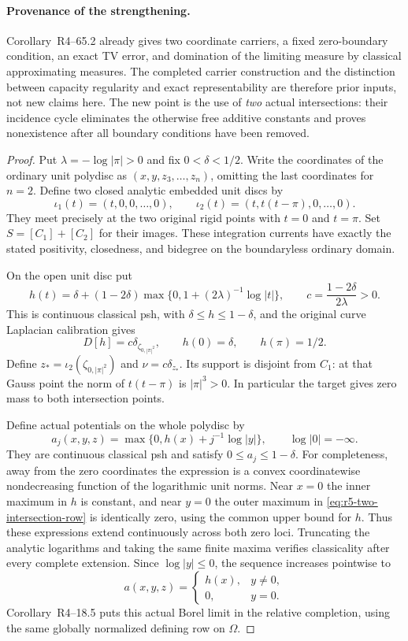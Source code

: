 \documentclass[11pt,a4paper]{article}
\numberwithin{equation}{section}
\theoremstyle{definition}
\theoremstyle{remark}
\begin{document}
\paragraph{Provenance of the strengthening.}
Corollary~\textup{R4--65.2}
already gives two coordinate carriers, a fixed zero-boundary
condition, an exact TV error, and domination of the limiting
measure by classical approximating measures.  The completed
carrier construction and the distinction between capacity
regularity and exact representability are therefore prior
inputs, not new claims here.  The new point is the use of
\emph{two} actual intersections: their incidence cycle
eliminates the otherwise free additive constants and proves
nonexistence after all boundary conditions have been removed.

\begin{proof}
Put $\lambda=-\log|\pi|>0$ and fix $0<\delta<1/2$.
Write the coordinates of the ordinary unit polydisc as
$(x,y,z_3,\ldots,z_n)$, omitting the last coordinates for
$n=2$.  Define two closed analytic embedded unit discs by
\[
 \iota_1(t)=(t,0,0,\ldots,0),\qquad
 \iota_2(t)=(t,t(t-\pi),0,\ldots,0).
\]
They meet precisely at the two original rigid points with
$t=0$ and $t=\pi$.  Set $S=[C_1]+[C_2]$ for their images.
These integration currents have exactly the stated positivity,
closedness, and bidegree on the boundaryless ordinary domain.

On the open unit disc put
\[
 h(t)=\delta+(1-2\delta)
                  \max\{0,1+(2\lambda)^{-1}\log|t|\},
 \qquad c=\frac{1-2\delta}{2\lambda}>0.
\]
This is continuous classical psh, with
$\delta\le h\le1-\delta$, and the original curve Laplacian
calibration gives
\[
     D[h]=c\delta_{\zeta_{0,|\pi|^2}},\qquad
     h(0)=\delta,\qquad h(\pi)=1/2.
\]
Define $z_* =\iota_2(\zeta_{0,|\pi|^2})$ and
$\nu=c\delta_{z_*}$.  Its support is disjoint from $C_1$:
at that Gauss point the norm of $t(t-\pi)$ is
$|\pi|^3>0$.  In particular the target gives zero mass to
both intersection points.

Define actual potentials on the whole polydisc by
\begin{equation}
 a_j(x,y,z)=\max\{0,h(x)+j^{-1}\log|y|\},
 \qquad \log|0|=-\infty.
 \label{eq:r5-two-intersection-row}
\end{equation}
They are continuous classical psh and satisfy
$0\le a_j\le1-\delta$.  For completeness, away from the
zero coordinates the expression is a convex coordinatewise
nondecreasing function of the logarithmic unit norms.  Near
$x=0$ the inner maximum in $h$ is constant, and near $y=0$
the outer maximum in \eqref{eq:r5-two-intersection-row} is
identically zero, using the common upper bound for $h$.
Thus these expressions extend continuously across both zero
loci.  Truncating the analytic logarithms and taking the same
finite maxima verifies classicality after every complete
extension.  Since $\log|y|\le0$, the sequence increases
pointwise to
\[
 a(x,y,z)=
   \begin{cases}
      h(x),&y\ne0,\\
      0,&y=0.
   \end{cases}
\]
Corollary~\textup{R4--18.5} puts this actual Borel
limit in the relative completion, using the same globally
normalized defining row on $\Omega$.


\end{proof}
\end{document}

